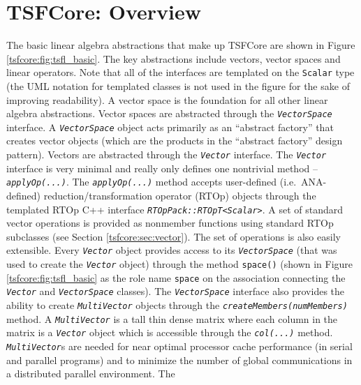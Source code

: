 %
\section{TSFCore: Overview}
\label{tsfcore:sec:TSFCore_core_overview}
%

The basic linear algebra abstractions that make up TSFCore are shown in
Figure \ref{tsfcore:fig:tsfl_basic}.  The key abstractions include
vectors, vector spaces and linear operators.  Note that all of the interfaces
are templated on the \texttt{Scalar} type (the UML notation for
templated classes is not used in the figure for the sake of improving
readability).  A vector space is the foundation for all other linear
algebra abstractions.  Vector spaces are abstracted through the
\texttt{\textit{VectorSpace}} interface.  A
\texttt{\textit{VectorSpace}} object acts primarily as an ``abstract
factory'' \cite{ref:gama_et_al_1995} that creates vector objects
(which are the products in the ``abstract factory'' design pattern).
Vectors are abstracted through the \texttt{\textit{Vector}} interface.
The \texttt{\textit{Vector}} interface is very minimal and really only
defines one nontrivial method -- \texttt{\textit{applyOp(\-...)}}.  The
\texttt{\textit{applyOp(\-...)}} method accepts user-defined
(i.e.~ANA-defined) reduction/transformation operator (RTOp) objects
through the templated RTOp C++ interface
\texttt{\textit{RTOpPack::RTOpT<Scalar>}}.  A set of standard vector
operations is provided as nonmember functions using standard RTOp
subclasses (see Section \ref{tsfcore:sec:vector}).  The set of
operations is also easily extensible.  Every \texttt{\textit{Vector}}
object provides access to its \texttt{\textit{VectorSpace}} (that was
used to create the \texttt{\textit{Vector}} object) through the method
\texttt{space()} (shown in Figure \ref{tsfcore:fig:tsfl_basic} as the
role name \texttt{space} on the association connecting the
\texttt{\textit{Vector}} and \texttt{\textit{VectorSpace}} classes).
The \texttt{\textit{VectorSpace}} interface also provides the ability
to create \texttt{\textit{Multi\-Vector}} objects through the
\texttt{\textit{createMembers(numMembers)}} method.  A
\texttt{\textit{Multi\-Vector}} is a tall thin dense matrix where each
column in the matrix is a
\texttt{\textit{Vector}} object which is accessible through the
\texttt{\textit{col(...)}} method.  \texttt{\textit{Multi\-Vector}}s
are needed for near optimal processor cache performance (in serial and
parallel programs) and to minimize the number of global communications
in a distributed parallel environment.  The
